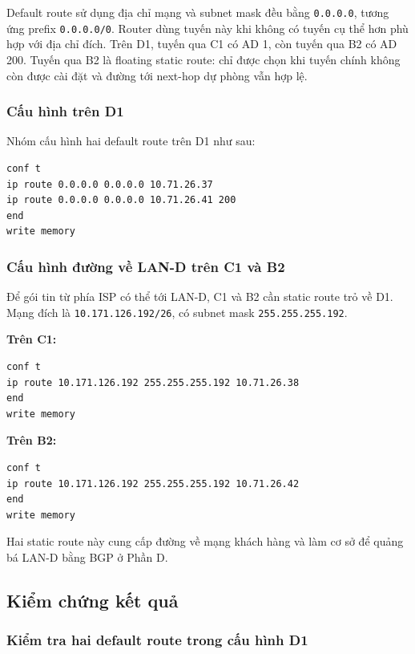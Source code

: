 Default route sử dụng địa chỉ mạng và subnet mask
đều bằng \texttt{0.0.0.0}, tương ứng prefix
\texttt{0.0.0.0/0}. Router dùng tuyến này khi
không có tuyến cụ thể hơn phù hợp với địa chỉ đích.
Trên D1, tuyến qua C1 có AD 1,
còn tuyến qua B2 có AD 200.
Tuyến qua B2 là floating static route:
chỉ được chọn khi tuyến chính không còn được cài đặt
và đường tới next-hop dự phòng vẫn hợp lệ.

\subsubsection{Cấu hình trên D1}

Nhóm cấu hình hai default route trên D1 như sau:

\begin{lstlisting}
conf t
ip route 0.0.0.0 0.0.0.0 10.71.26.37
ip route 0.0.0.0 0.0.0.0 10.71.26.41 200
end
write memory
\end{lstlisting}

\subsubsection{Cấu hình đường về LAN-D trên C1 và B2}

Để gói tin từ phía ISP có thể tới LAN-D,
C1 và B2 cần static route trỏ về D1.
Mạng đích là \texttt{10.171.126.192/26},
có subnet mask \texttt{255.255.255.192}.

\textbf{Trên C1:}

\begin{lstlisting}
conf t
ip route 10.171.126.192 255.255.255.192 10.71.26.38
end
write memory
\end{lstlisting}

\textbf{Trên B2:}

\begin{lstlisting}
conf t
ip route 10.171.126.192 255.255.255.192 10.71.26.42
end
write memory
\end{lstlisting}

Hai static route này cung cấp đường về mạng khách hàng
và làm cơ sở để quảng bá LAN-D bằng BGP ở Phần D.

\subsection{Kiểm chứng kết quả}

\subsubsection{Kiểm tra hai default route trong cấu hình D1}

